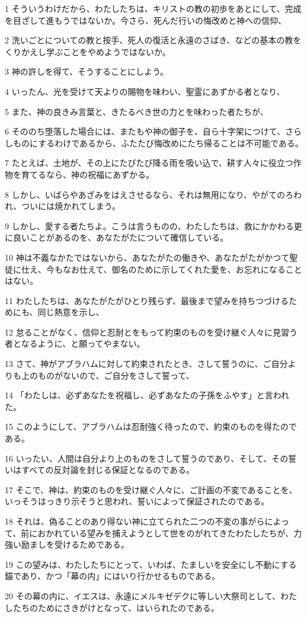 \par 1 そういうわけだから、わたしたちは、キリストの教の初歩をあとにして、完成を目ざして進もうではないか。今さら、死んだ行いの悔改めと神への信仰、
\par 2 洗いごとについての教と按手、死人の復活と永遠のさばき、などの基本の教をくりかえし学ぶことをやめようではないか。
\par 3 神の許しを得て、そうすることにしよう。
\par 4 いったん、光を受けて天よりの賜物を味わい、聖霊にあずかる者となり、
\par 5 また、神の良きみ言葉と、きたるべき世の力とを味わった者たちが、
\par 6 そののち堕落した場合には、またもや神の御子を、自ら十字架につけて、さらしものにするわけであるから、ふたたび悔改めにたち帰ることは不可能である。
\par 7 たとえば、土地が、その上にたびたび降る雨を吸い込で、耕す人々に役立つ作物を育てるなら、神の祝福にあずかる。
\par 8 しかし、いばらやあざみをはえさせるなら、それは無用になり、やがてのろわれ、ついには焼かれてしまう。
\par 9 しかし、愛する者たちよ。こうは言うものの、わたしたちは、救にかかわる更に良いことがあるのを、あなたがたについて確信している。
\par 10 神は不義なかたではないから、あなたがたの働きや、あなたがたがかつて聖徒に仕え、今もなお仕えて、御名のために示してくれた愛を、お忘れになることはない。
\par 11 わたしたちは、あなたがたがひとり残らず、最後まで望みを持ちつづけるためにも、同じ熱意を示し、
\par 12 怠ることがなく、信仰と忍耐とをもって約束のものを受け継ぐ人々に見習う者となるように、と願ってやまない。
\par 13 さて、神がアブラハムに対して約束されたとき、さして誓うのに、ご自分よりも上のものがないので、ご自分をさして誓って、
\par 14 「わたしは、必ずあなたを祝福し、必ずあなたの子孫をふやす」と言われた。
\par 15 このようにして、アブラハムは忍耐強く待ったので、約束のものを得たのである。
\par 16 いったい、人間は自分より上のものをさして誓うのであり、そして、その誓いはすべての反対論を封じる保証となるのである。
\par 17 そこで、神は、約束のものを受け継ぐ人々に、ご計画の不変であることを、いっそうはっきり示そうと思われ、誓いによって保証されたのである。
\par 18 それは、偽ることのあり得ない神に立てられた二つの不変の事がらによって、前におかれている望みを捕えようとして世をのがれてきたわたしたちが、力強い励ましを受けるためである。
\par 19 この望みは、わたしたちにとって、いわば、たましいを安全にし不動にする錨であり、かつ「幕の内」にはいり行かせるものである。
\par 20 その幕の内に、イエスは、永遠にメルキゼデクに等しい大祭司として、わたしたちのためにさきがけとなって、はいられたのである。

